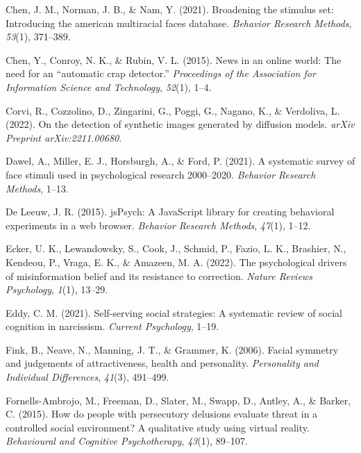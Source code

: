 \documentclass[
  man,floatsintext]{apa6}
\newlength{\cslhangindent}
\newlength{\cslentryspacingunit} %
\newenvironment{CSLReferences}[2] %
 {%
  \setlength{\parindent}{0pt}
  \ifodd #1
  \let\oldpar\par
  \def\par{\hangindent=\cslhangindent\oldpar}
  \fi
  \setlength{\parskip}{#2\cslentryspacingunit}
 }%
 {}
\begin{document}
\begin{CSLReferences}{1}{0}
\leavevmode{}%
Chen, J. M., Norman, J. B., \& Nam, Y. (2021). Broadening the stimulus set: Introducing the american multiracial faces database. \emph{Behavior Research Methods}, \emph{53}(1), 371--389.

\leavevmode{}%
Chen, Y., Conroy, N. K., \& Rubin, V. L. (2015). News in an online world: The need for an {``automatic crap detector.''} \emph{Proceedings of the Association for Information Science and Technology}, \emph{52}(1), 1--4.

\leavevmode{}%
Corvi, R., Cozzolino, D., Zingarini, G., Poggi, G., Nagano, K., \& Verdoliva, L. (2022). On the detection of synthetic images generated by diffusion models. \emph{arXiv Preprint arXiv:2211.00680}.

\leavevmode{}%
Dawel, A., Miller, E. J., Horsburgh, A., \& Ford, P. (2021). A systematic survey of face stimuli used in psychological research 2000--2020. \emph{Behavior Research Methods}, 1--13.

\leavevmode{}%
De Leeuw, J. R. (2015). jsPsych: A JavaScript library for creating behavioral experiments in a web browser. \emph{Behavior Research Methods}, \emph{47}(1), 1--12.

\leavevmode{}%
Ecker, U. K., Lewandowsky, S., Cook, J., Schmid, P., Fazio, L. K., Brashier, N., Kendeou, P., Vraga, E. K., \& Amazeen, M. A. (2022). The psychological drivers of misinformation belief and its resistance to correction. \emph{Nature Reviews Psychology}, \emph{1}(1), 13--29.

\leavevmode{}%
Eddy, C. M. (2021). Self-serving social strategies: A systematic review of social cognition in narcissism. \emph{Current Psychology}, 1--19.

\leavevmode{}%
Fink, B., Neave, N., Manning, J. T., \& Grammer, K. (2006). Facial symmetry and judgements of attractiveness, health and personality. \emph{Personality and Individual Differences}, \emph{41}(3), 491--499.

\leavevmode{}%
Fornells-Ambrojo, M., Freeman, D., Slater, M., Swapp, D., Antley, A., \& Barker, C. (2015). How do people with persecutory delusions evaluate threat in a controlled social environment? A qualitative study using virtual reality. \emph{Behavioural and Cognitive Psychotherapy}, \emph{43}(1), 89--107.


\end{CSLReferences}
\end{document}
